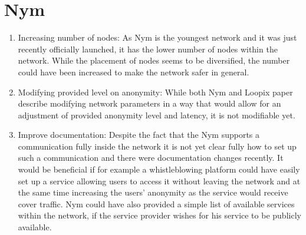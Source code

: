 \section{Nym}
\begin{enumerate}
    \item Increasing number of nodes: As Nym is the youngest network and it was just recently officially launched, it has the lower number of nodes within the network. While the placement of nodes seems to be diversified, the number could have been increased to make the network safer in general.
    \item Modifying provided level on anonymity: While both Nym and Loopix paper describe modifying network parameters in a way that would allow for an adjustment of provided anonymity level and latency, it is not modifiable yet.
    \item Improve documentation: Despite the fact that the Nym supports a communication fully inside the network it is not yet clear fully how to set up such a communication and there were documentation changes recently. It would be beneficial if for example a whistleblowing platform could have easily set up a service allowing users to access it without leaving the network and at the same time increasing the users’ anonymity as the service would receive cover traffic. Nym could have also provided a simple list of available services within the network, if the service provider wishes for his service to be publicly available.
\end{enumerate}
